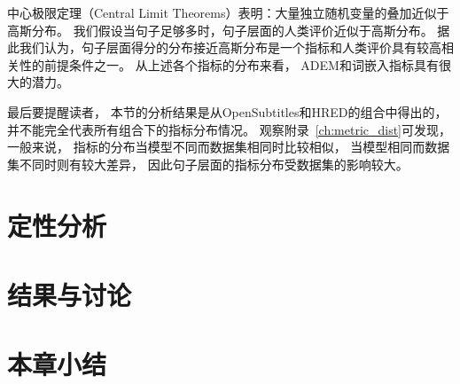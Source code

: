 中心极限定理（Central Limit Theorems）表明：大量独立随机变量的叠加近似于高斯分布。
我们假设当句子足够多时，句子层面的人类评价近似于高斯分布。
据此我们认为，句子层面得分的分布接近高斯分布是一个指标和人类评价具有较高相关性的前提条件之一。
从上述各个指标的分布来看， ADEM和词嵌入指标具有很大的潜力。

最后要提醒读者，
本节的分析结果是从OpenSubtitles和HRED的组合中得出的，
并不能完全代表所有组合下的指标分布情况。
观察附录~\ref{ch:metric_dist}可发现， 一般来说，
指标的分布当模型不同而数据集相同时比较相似，
当模型相同而数据集不同时则有较大差异，
因此句子层面的指标分布受数据集的影响较大。

\section{定性分析}\label{sec:qualitative_analysis}

\section{结果与讨论}\label{sec:result_and_discussion}

\section{本章小结}\label{sec:experiment_conclusion}
